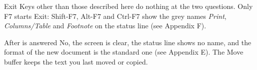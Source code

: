 \begin{Feature}{Exit}
Keys other than those described here do nothing at the two questions.
Only F7 starts Exit: Shift-F7, Alt-F7 and Ctrl-F7 show the grey names
\textit{Print}, \textit{Columns/Table} and \textit{Footnote} on the status
line (see Appendix F).

After  is answered No, the screen is clear, the status line
shows no name, and the format of the new document is the standard one (see
Appendix E).  The Move buffer keeps the text you last moved or copied.

\end{Feature}
